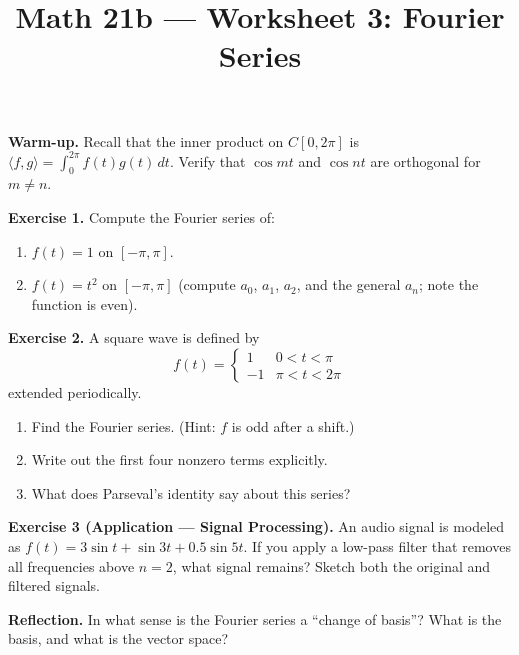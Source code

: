 \documentclass{amsart}
\title{Math 21b --- Worksheet 3: Fourier Series}
\date{}
\begin{document}
\maketitle

\textbf{Warm-up.} Recall that the inner product on $C[0,2\pi]$ is $\langle f, g \rangle = \int_0^{2\pi} f(t)g(t)\,dt$. Verify that $\cos mt$ and $\cos nt$ are orthogonal for $m \neq n$.

\bigskip

\textbf{Exercise 1.} Compute the Fourier series of:
\begin{enumerate}
    \item[(a)] $f(t) = 1$ on $[-\pi, \pi]$.
    \item[(b)] $f(t) = t^2$ on $[-\pi, \pi]$ (compute $a_0$, $a_1$, $a_2$, and the general $a_n$; note the function is even).
\end{enumerate}

\bigskip

\textbf{Exercise 2.} A square wave is defined by
\[
f(t) = \begin{cases} 1 & 0 < t < \pi \\ -1 & \pi < t < 2\pi \end{cases}
\]
extended periodically.
\begin{enumerate}
    \item[(a)] Find the Fourier series. (Hint: $f$ is odd after a shift.)
    \item[(b)] Write out the first four nonzero terms explicitly.
    \item[(c)] What does Parseval's identity say about this series?
\end{enumerate}

\bigskip

\textbf{Exercise 3 (Application --- Signal Processing).} An audio signal is modeled as $f(t) = 3\sin t + \sin 3t + 0.5\sin 5t$. If you apply a low-pass filter that removes all frequencies above $n = 2$, what signal remains? Sketch both the original and filtered signals.

\bigskip

\textbf{Reflection.} In what sense is the Fourier series a ``change of basis''? What is the basis, and what is the vector space?
\end{document}
